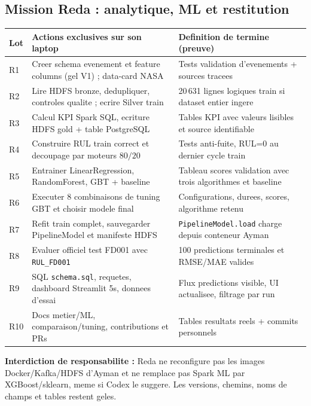 \documentclass[10pt,a4paper]{article}
\newcommand{\code}[1]{{\small\ttfamily\nolinkurl{#1}}}
\begin{document}
\subsection{Mission Reda : analytique, ML et restitution}
\begin{longtable}{@{}p{15mm}p{80mm}p{54mm}@{}}
\toprule
\textbf{Lot} & \textbf{Actions exclusives sur son laptop} & \textbf{Definition de termine (preuve)}\\\midrule
\endhead
R1 & Creer schema evenement et feature columns (gel V1) ; data-card NASA & Tests validation d'evenements + sources tracees\\
R2 & Lire HDFS bronze, dedupliquer, controles qualite ; ecrire Silver train & 20\,631 lignes logiques train si dataset entier ingere\\
R3 & Calcul KPI Spark SQL, ecriture HDFS gold + table PostgreSQL & Tables KPI avec valeurs lisibles et source identifiable\\
R4 & Construire RUL train correct et decoupage par moteurs \(80/20\) & Tests anti-fuite, RUL=0 au dernier cycle train\\
R5 & Entrainer LinearRegression, RandomForest, GBT + baseline & Tableau scores validation avec trois algorithmes et baseline\\
R6 & Executer 8 combinaisons de tuning GBT et choisir modele final & Configurations, durees, scores, algorithme retenu\\
R7 & Refit train complet, sauvegarder PipelineModel et manifeste HDFS & \code{PipelineModel.load} charge depuis conteneur Ayman\\
R8 & Evaluer officiel test FD001 avec \code{RUL_FD001} & 100 predictions terminales et RMSE/MAE valides\\
R9 & SQL \code{schema.sql}, requetes, dashboard Streamlit 5s, donnees d'essai & Flux predictions visible, UI actualisee, filtrage par run\\
R10 & Docs metier/ML, comparaison/tuning, contributions et PRs & Tables resultats reels + commits personnels\\
\bottomrule
\end{longtable}
\textbf{Interdiction de responsabilite :} Reda ne reconfigure pas les images Docker/Kafka/HDFS d'Ayman et ne remplace pas Spark ML par XGBoost/sklearn, meme si Codex le suggere. Les versions, chemins, noms de champs et tables restent geles.
\end{document}
